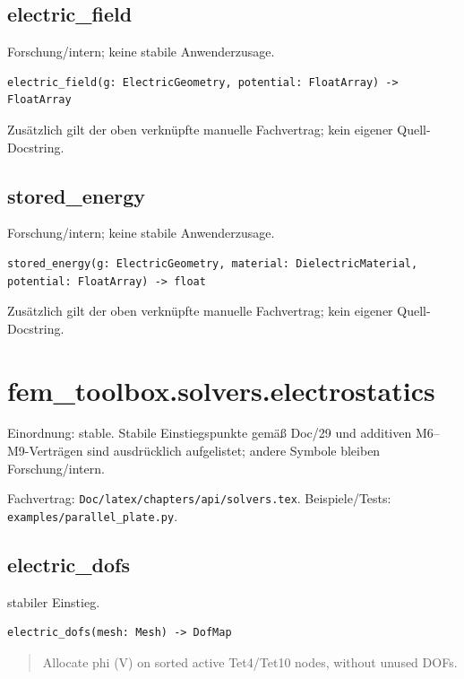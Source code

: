 \subsection{electric\_field}
Forschung/intern; keine stabile Anwenderzusage.
\begin{lstlisting}
electric_field(g: ElectricGeometry, potential: FloatArray) -> FloatArray
\end{lstlisting}
Zusätzlich gilt der oben verknüpfte manuelle Fachvertrag; kein eigener Quell-Docstring.
\subsection{stored\_energy}
Forschung/intern; keine stabile Anwenderzusage.
\begin{lstlisting}
stored_energy(g: ElectricGeometry, material: DielectricMaterial, potential: FloatArray) -> float
\end{lstlisting}
Zusätzlich gilt der oben verknüpfte manuelle Fachvertrag; kein eigener Quell-Docstring.
\section{fem\_toolbox.solvers.electrostatics}
Einordnung: stable. Stabile Einstiegspunkte gemäß Doc/29 und additiven M6–M9-Verträgen sind ausdrücklich aufgelistet; andere Symbole bleiben Forschung/intern.
\par Fachvertrag: \nolinkurl{Doc/latex/chapters/api/solvers.tex}. Beispiele/Tests:
\nolinkurl{examples/parallel_plate.py}.
\subsection{electric\_dofs}
stabiler Einstieg.
\begin{lstlisting}
electric_dofs(mesh: Mesh) -> DofMap
\end{lstlisting}
\begin{quote}
Allocate phi (V) on sorted active Tet4/Tet10 nodes, without unused DOFs.
\end{quote}
